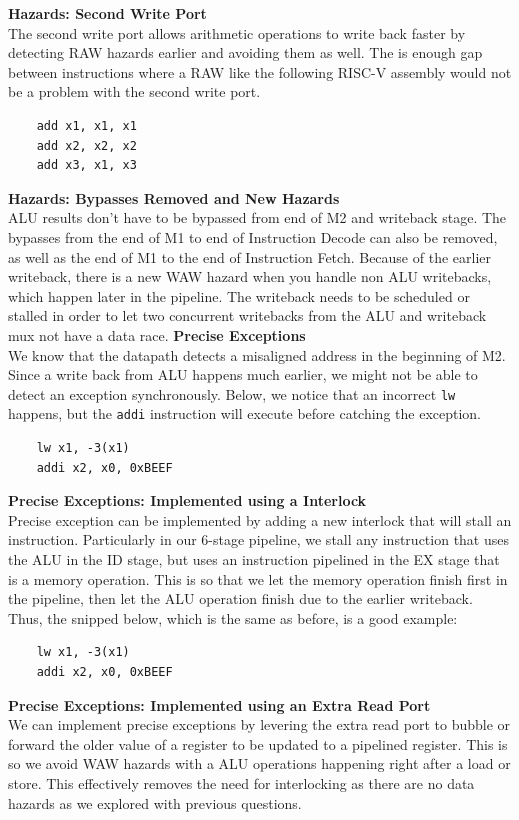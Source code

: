 \documentclass[11pt]{article}
\begin{document}
\begin{Parts}
	\Part \textbf{Hazards: Second Write Port} \\
	The second write port allows arithmetic operations to write back faster by detecting RAW hazards earlier and avoiding them as well. The is enough gap between instructions where a RAW like the following RISC-V assembly would not be a problem with the second write port.
	\begin{lstlisting}
    add x1, x1, x1
    add x2, x2, x2
    add x3, x1, x3
    \end{lstlisting}
	\Part \textbf{Hazards: Bypasses Removed and New Hazards} \\
	ALU results don't have to be bypassed from end of M2 and writeback stage. The bypasses from the end of M1 to end of Instruction Decode can also be removed, as well as the end of M1 to the end of Instruction Fetch. Because of the earlier writeback, there is a new WAW hazard when you handle non ALU writebacks, which happen later in the pipeline. The writeback needs to be scheduled or stalled in order to let two concurrent writebacks from the ALU and writeback mux not have a data race.
	\Part \textbf{Precise Exceptions} \\
	We know that the datapath detects a misaligned address in the beginning of M2. Since a write back from ALU happens much earlier, we might not be able to detect an exception synchronously. Below, we notice that an incorrect
	\verb|lw| happens, but the \verb|addi| instruction will execute before catching the exception.
	\begin{lstlisting}
	lw x1, -3(x1)
	addi x2, x0, 0xBEEF
    \end{lstlisting}
	\Part \textbf{Precise Exceptions: Implemented using a Interlock} \\
	Precise exception can be implemented by adding a new interlock that will stall an instruction. Particularly in our 6-stage pipeline, we stall any instruction that uses the ALU in the ID stage, but uses an instruction pipelined in the EX stage that is a memory operation. This is so that we let the memory operation finish first in the pipeline, then let the ALU operation finish due to the earlier writeback. Thus, the snipped below, which is the same as before, is a good example:
	\begin{lstlisting}
	lw x1, -3(x1)
	addi x2, x0, 0xBEEF
    \end{lstlisting}
	\Part \textbf{Precise Exceptions: Implemented using an Extra Read Port} \\
	We can implement precise exceptions by levering the extra read port to bubble or forward the older value of a register to be updated to a pipelined register. This is so we avoid WAW hazards with a ALU operations happening right after a load or store. This effectively removes the need for interlocking as there are no data hazards as we explored with previous questions.
\end{Parts}
\end{document}
